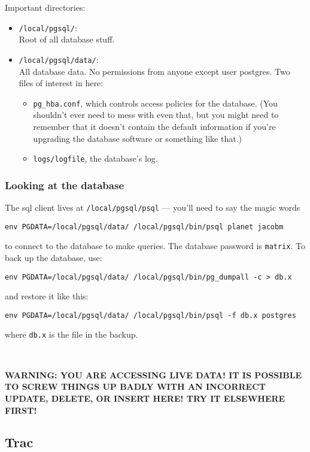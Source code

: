 \documentclass{article}
\begin{document}
Important directories: 
\begin{itemize}
\item \texttt{/local/pgsql/}: \\
Root of all database stuff.

\item \texttt{/local/pgsql/data/}: \\
All database data. No permissions from anyone
except user postgres. Two files of interest in here:
\begin{itemize}
  \item \texttt{pg\_hba.conf}, which controls access policies for
  the database. (You shouldn't ever need to mess with even that, but
  you might need to remember that it doesn't contain the default
  information if you're upgrading the database software or something
  like that.)
  \item \texttt{logs/logfile}, the database's log. 
\end{itemize}
\end{itemize}

\subsubsection{Looking at the database}

The sql client lives at \texttt{/local/pgsql/psql} --- you'll need to
say the magic words 
\begin{center}
\tt env PGDATA=/local/pgsql/data/ /local/pgsql/bin/psql planet jacobm
\end{center}
to connect to the database to make queries. The database password is \texttt{matrix}.
To back up the database, use:
\begin{center}
\verb|env PGDATA=/local/pgsql/data/ /local/pgsql/bin/pg_dumpall -c > db.x|
\end{center}
and restore it like this:
\begin{center}
\verb|env PGDATA=/local/pgsql/data/ /local/pgsql/bin/psql -f db.x postgres|
\end{center}
where \texttt{db.x} is the file in the backup.

~

\textbf{WARNING: YOU ARE ACCESSING LIVE DATA! IT IS POSSIBLE
TO SCREW THINGS UP BADLY WITH AN INCORRECT UPDATE, DELETE, OR INSERT
HERE! TRY IT ELSEWHERE FIRST!}

\subsection{Trac}
\end{document}
